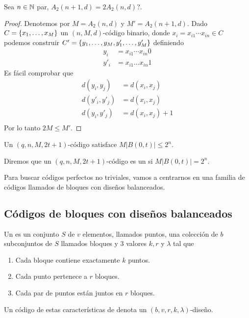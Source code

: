 \begin{lemma}
	Sea $n\in\mathbb{N}$ par, $A_2(n+1, d)=2A_2(n, d)$?.
\end{lemma}
\begin{proof}
	Denotemos por $M=A_2(n, d)$ y $M'=A_2(n+1, d)$.
	Dado $C=\left\{x_1, \dots, x_M\right\}$ un $(n, M, d)$-código binario, donde $x_i=x_{i1}\cdots x_{in}\in C$ podemos construir $C'=\left\{y_1,\dots, y_M, y'_1,\dots, y'_M\right\}$ definiendo
	\begin{align*}
		y_i&= x_{i1}\cdots x_{in}0\\
		y'_i&=x_{i1}\dots x_{in}1
	\end{align*}
	Es fácil comprobar que
	\begin{align*}
		d(y_i, y_j) &= d(x_i, x_j)\\
		d(y'_i, y'_j) &= d(x_i, x_j)\\
		d(y_i, y'_j) &= d(x_i, x_j)+1\\
	\end{align*}
	Por lo tanto $2M\leq M'$.
\end{proof}

\begin{theorem}
	Un $(q, n, M, 2t+1)$-código satisface $M|B(0, t)|\leq 2^n$.
\end{theorem}

\begin{definition}
	Diremos que un $(q, n, M, 2t+1)$-código es un  si $M|B(0, t)|= 2^n$.
\end{definition}

Para buscar códigos perfectos no triviales, vamos a centrarnos en una familia de códigos llamados de bloques con diseños balanceados.

\subsection{Códigos de bloques con diseños balanceados}
\begin{definition}
Un  es un conjunto $S$ de $v$ elementos, llamados puntos, una colección de $b$ subconjuntos de $S$ llamados bloques y 3 valores $k, r$ y $\lambda$ tal que
	\begin{enumerate}
		\item Cada bloque contiene exactamente $k$ puntos.
		\item Cada punto pertenece a $r$ bloques.
		\item Cada par de puntos están juntos en $r$ bloques.
	\end{enumerate}
	Un código de estas características de denota un $(b, v, r, k, \lambda)$-diseño.
\end{definition}

